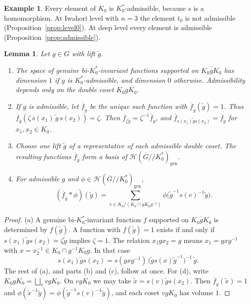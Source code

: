 \documentclass[12pt,letterpaper]{amsart}
\numberwithin{equation}{section}
\newtheorem{lemma}[theorem]{Lemma}
\theoremstyle{definition}
\newtheorem{example}[theorem]{Example}
\theoremstyle{remark}
\newcommand{\cH}{\mathcal{H}}
\newcommand{\Gbar}{\overline{G}}
\newcommand{\gen}{\mathrm{gen}}
\newcommand{\fbar}{\overline{f}}
\begin{document}
\begin{example}
Every element of $K_0$ is $K_0^*$-admissible, because $s$ is a
homomorphism. At Iwahori level with $n=3$ the element $t_0$ is not
admissible (Proposition~\ref{prop:level0}). At deep level every element
is admissible (Proposition~\ref{prop:admissible}).
\end{example}

\begin{lemma}
\label{lemma:support}
Let $g\in G$ with lift $\tilde g$.
\begin{enumerate}[leftmargin=2em,label=(\alph*)]
\item The space of genuine bi-$K_0^*$-invariant functions supported on
$\overline{K_0gK_0}$ has dimension $1$ if $g$ is $K_0^*$-admissible,
and dimension $0$ otherwise. Admissibility depends only on the double
coset $K_0gK_0$.
\item If $g$ is admissible, let $\fbar_{\tilde g}$ be the unique such
function with $\fbar_{\tilde g}(\tilde g)=1$. Thus
$\fbar_{\tilde g}(\zeta\,s(x_1)\,\tilde g\,s(x_2))=\zeta$. Then
$\fbar_{\zeta\tilde g}=\zeta^{-1}\fbar_{\tilde g}$, and
$\fbar_{s(x_1)\tilde gs(x_2)}=\fbar_{\tilde g}$ for $x_1,x_2\in K_0$.
\item Choose one lift $\tilde g$ of a representative of each
admissible double coset. The resulting functions $\fbar_{\tilde g}$
form a basis of $\cH(\Gbar/\!/K_0^*)_{\gen}$.
\item For admissible $g$ and $\phi\in\cH(\Gbar/\!/K_0^*)_{\gen}$,
\[
(\fbar_{\tilde g}*\phi)(\tilde y)
=\sum_{v\in K_0/(K_0\cap gK_0g^{-1})}
\phi\bigl(\tilde g^{-1}s(v)^{-1}\tilde y\bigr).
\]
\end{enumerate}
\end{lemma}

\begin{proof}
(a) A genuine bi-$K_0^*$-invariant function $f$ supported on
$\overline{K_0gK_0}$ is determined by $f(\tilde g)$. A function with
$f(\tilde g)=1$ exists if and only if $s(x_1)\tilde gs(x_2)=\zeta\tilde
g$ implies $\zeta=1$. The relation $x_1gx_2=g$ means $x_1=gxg^{-1}$
with $x=x_2^{-1}\in K_0\cap g^{-1}K_0g$. In that case
\[
s(x_1)\tilde gs(x_2)=s(gxg^{-1})\,\bigl(\tilde gs(x)\tilde
g^{-1}\bigr)^{-1}\,\tilde g .
\]
The rest of (a), and parts (b) and (c), follow at once. For (d), write
$K_0gK_0=\bigsqcup_v vgK_0$. On $vgK_0$ we may take
$\tilde x=s(v)\tilde gs(x_2)$. Then $\fbar_{\tilde g}(\tilde x)=1$ and
$\phi(\tilde x^{-1}\tilde y)=\phi(\tilde g^{-1}s(v)^{-1}\tilde y)$, and
each coset $vgK_0$ has volume $1$.
\end{proof}
\end{document}
